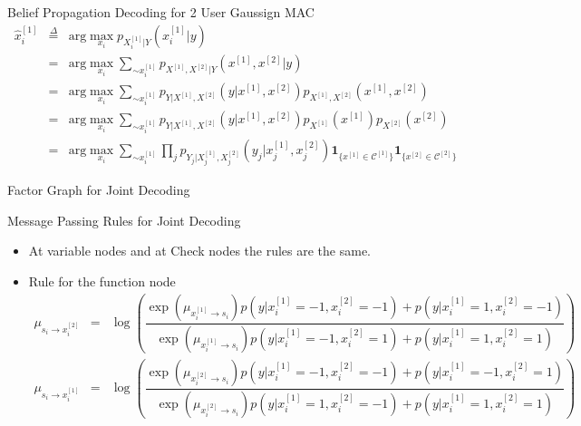 \documentclass{beamer}
\begin{document}
  \begin{frame}{Belief Propagation Decoding for 2 User Gaussign MAC}
    \begin{eqnarray}
  \hat{x}_i^{[1]} 	&\overset{\Delta}{=}& \text{arg} \max_{x_i}p_{X_i^{[1]}|Y}(x_i^{[1]}|y) \label{eq:mac1} \\
 			&=& \text{arg} \max_{x_i}\sum_{\sim x_i^{[1]}} p_{X^{[1]}, X^{[2]}|Y} (x^{[1]}, x^{[2]}|y)  \label{eq:mac2}\\
 			&=& \text{arg} \max_{x_i}\sum_{\sim x_i^{[1]}} p_{Y|X^{[1]}, X^{[2]}} (y|x^{[1]}, x^{[2]}) p_{X^{[1]}, X^{[2]}}(x^{[1]}, x^{[2]}) \label{eq:mac3}\\
 			&=& \text{arg} \max_{x_i}\sum_{\sim x_i^{[1]}} p_{Y|X^{[1]}, X^{[2]}} (y|x^{[1]}, x^{[2]}) p_{X^{[1]}}(x^{[1]}) p_{X^{[2]}}(x^{[2]}) \label{eq:mac4}\\
 			&=& \text{arg} \max_{x_i}\sum_{\sim x_i^{[1]}} \prod_j p_{Y_j|X_j^{[1]}, X_j^{[2]}} (y_j|x_j^{[1]}, x_j^{[2]}) \mathbf{1}_{\lbrace x^{[1]} \in \mathcal{C}^{[1]}\rbrace} \mathbf{1}_{\lbrace x^{[2]} \in \mathcal{C}^{[2]}\rbrace} \label{eq:mac5}
 \end{eqnarray}
  \end{frame}

  \begin{frame}{Factor Graph for Joint Decoding}
   
  \end{frame}

  \begin{frame}{Message Passing Rules for Joint Decoding}
   \begin{itemize}\itemsep 0.4cm
    \item At variable nodes and at Check nodes the rules are the same.
    \item Rule for the function node
    \fontsize{7pt}{7.2}\selectfont
    \begin{eqnarray}
  \mu_{s_i \rightarrow x_i^{[2]}} &=& \log \left( \dfrac{\exp( \mu_{x_i^{[1]} \rightarrow s_i}) p(y|x_i^{[1]} = -1, x_i^{[2]} = -1) + p(y|x_i^{[1]} = 1, x_i^{[2]} = -1)}{\exp( \mu_{x_i^{[1]} \rightarrow s_i}) p(y|x_i^{[1]} = -1, x_i^{[2]} = 1) + p(y|x_i^{[1]} = 1, x_i^{[2]} = 1)} \right) \\
  \mu_{s_i \rightarrow x_i^{[1]}} &=& \log \left( \dfrac{\exp( \mu_{x_i^{[2]} \rightarrow s_i}) p(y|x_i^{[1]} = -1, x_i^{[2]} = -1) + p(y|x_i^{[1]} = -1, x_i^{[2]} = 1)}{\exp( \mu_{x_i^{[2]} \rightarrow s_i}) p(y|x_i^{[1]} = 1, x_i^{[2]} = -1) + p(y|x_i^{[1]} = 1, x_i^{[2]} = 1)} \right)
  \end{eqnarray}
   \end{itemize}
  \end{frame}
\end{document}
